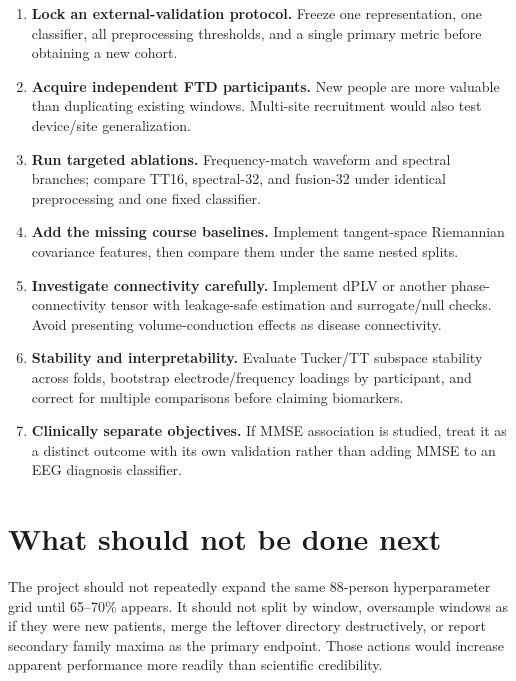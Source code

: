 \begin{enumerate}
  \item \textbf{Lock an external-validation protocol.} Freeze one representation,
  one classifier, all preprocessing thresholds, and a single primary metric
  before obtaining a new cohort.
  \item \textbf{Acquire independent FTD participants.} New people are more valuable
  than duplicating existing windows. Multi-site recruitment would also test
  device/site generalization.
  \item \textbf{Run targeted ablations.} Frequency-match waveform and spectral
  branches; compare TT16, spectral-32, and fusion-32 under identical preprocessing
  and one fixed classifier.
  \item \textbf{Add the missing course baselines.} Implement tangent-space
  Riemannian covariance features, then compare them under the same nested splits.
  \item \textbf{Investigate connectivity carefully.} Implement dPLV or another
  phase-connectivity tensor with leakage-safe estimation and surrogate/null
  checks. Avoid presenting volume-conduction effects as disease connectivity.
  \item \textbf{Stability and interpretability.} Evaluate Tucker/TT subspace
  stability across folds, bootstrap electrode/frequency loadings by participant,
  and correct for multiple comparisons before claiming biomarkers.
  \item \textbf{Clinically separate objectives.} If MMSE association is studied,
  treat it as a distinct outcome with its own validation rather than adding MMSE
  to an EEG diagnosis classifier.
\end{enumerate}

\section{What should not be done next}

The project should not repeatedly expand the same 88-person hyperparameter grid
until 65--70\% appears. It should not split by window, oversample \FTD{} windows
as if they were new patients, merge the leftover directory destructively, or
report secondary family maxima as the primary endpoint. Those actions would
increase apparent performance more readily than scientific credibility.

